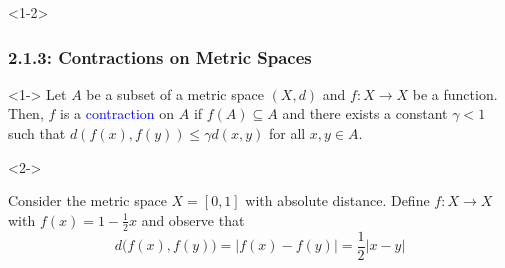 \documentclass[10pt,english,aspectratio=169]{beamer}
\begin{document}
\begin{frame}<1-2> \frametitle{2.1.3: Contractions on Metric Spaces}

\begin{definition}<1->
Let $A$ be a subset of a metric space $(X,d)$ and $f \colon X \rightarrow X$ be a function.
Then, $f$ is a \textcolor{blue}{contraction} on $A$ if $f(A) \subseteq A$ and there exists a constant $\gamma < 1$ such that $d \left( f(x),f(y) \right) \leq \gamma  d(x,y)$ for all $x,y\in A$.
\end{definition}

\begin{example}<2->
\begin{minipage}{0.52\textwidth}
Consider the metric space $X=[0,1]$ with absolute distance.
Define $f\colon X \to X$ with $f(x) = 1-\frac{1}{2}x$ and observe that \vspace{-2mm} \[d\big(f(x),f(y)\big)=|f(x)-f(y)| = \frac{1}{2}|x-y| \] \\[-2mm]
\end{minipage}
\hfill
\begin{minipage}{0.43\textwidth}
\end{minipage}
\end{example}


\end{frame}
\end{document}
